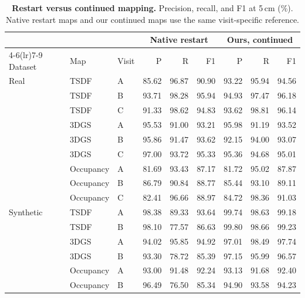 \begin{table}[t]
\centering
\fontsize{9}{10.3}\selectfont
\setlength{\tabcolsep}{5pt}
\renewcommand{\arraystretch}{1.08}
\begin{tabular}{@{}lll*{6}{r}@{}}
\toprule
& & & \multicolumn{3}{c}{Native restart} & \multicolumn{3}{c}{Ours, continued} \\ \cmidrule(lr){4-6}\cmidrule(lr){7-9}
Dataset & Map & Visit & P & R & F1 & P & R & F1 \\ \midrule
Real & TSDF & A & 85.62 & 96.87 & 90.90 & 93.22 & 95.94 & 94.56 \\
 & TSDF & B & 93.71 & 98.28 & 95.94 & 94.93 & 97.47 & 96.18 \\
 & TSDF & C & 91.33 & 98.62 & 94.83 & 93.62 & 98.81 & 96.14 \\
 & 3DGS & A & 95.53 & 91.00 & 93.21 & 95.98 & 91.19 & 93.52 \\
 & 3DGS & B & 95.86 & 91.47 & 93.62 & 92.15 & 94.00 & 93.07 \\
 & 3DGS & C & 97.00 & 93.72 & 95.33 & 95.36 & 94.68 & 95.01 \\
 & Occupancy & A & 81.69 & 93.43 & 87.17 & 81.72 & 95.02 & 87.87 \\
 & Occupancy & B & 86.79 & 90.84 & 88.77 & 85.44 & 93.10 & 89.11 \\
 & Occupancy & C & 82.41 & 96.66 & 88.97 & 84.72 & 98.36 & 91.03 \\
\midrule
Synthetic & TSDF & A & 98.38 & 89.33 & 93.64 & 99.74 & 98.63 & 99.18 \\
 & TSDF & B & 98.10 & 77.57 & 86.63 & 99.80 & 98.66 & 99.23 \\
 & 3DGS & A & 94.02 & 95.85 & 94.92 & 97.01 & 98.49 & 97.74 \\
 & 3DGS & B & 93.30 & 78.72 & 85.39 & 97.15 & 95.99 & 96.57 \\
 & Occupancy & A & 93.00 & 91.48 & 92.24 & 93.13 & 91.68 & 92.40 \\
 & Occupancy & B & 96.49 & 76.50 & 85.34 & 94.90 & 93.58 & 94.23 \\
\bottomrule
\end{tabular}
\caption{\textbf{Restart versus continued mapping.} Precision, recall, and F1 at 5\,cm (\%). Native restart maps and our continued maps use the same visit-specific reference.}
\label{tab:supp_restart}
\end{table}
